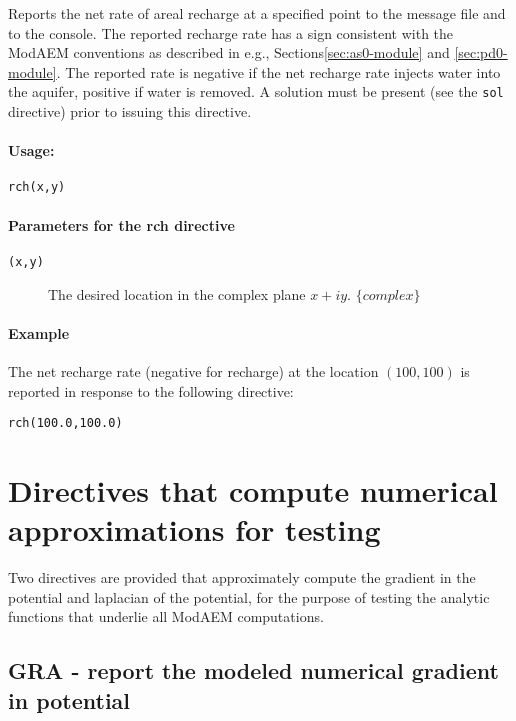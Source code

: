 Reports the net rate of areal recharge at a specified point to the
message file and to the console. The reported recharge rate has a
sign consistent with the ModAEM conventions as described in e.g.,
Sections\ref{sec:as0-module} and \ref{sec:pd0-module}. The reported
rate is negative if the net recharge rate injects water into the aquifer,
positive if water is removed. A solution must be present (see the
\texttt{sol} directive) prior to issuing this directive.


\paragraph{Usage:}
\begin{verbatim}
rch(x,y)
\end{verbatim}

\paragraph{Parameters for the \textsf{rch} directive }
\begin{description}
\item [{\texttt{(x,y)}}] The desired location in the complex plane $x+iy$.
$\{complex\}$
\end{description}

\paragraph{Example}

The net recharge rate (negative for recharge) at the location $(100,100)$
is reported in response to the following directive:
\begin{verbatim}
rch(100.0,100.0)
\end{verbatim}

\section{Directives that compute numerical approximations for testing}

Two directives are provided that approximately compute the gradient
in the potential and laplacian of the potential, for the purpose of
testing the analytic functions that underlie all ModAEM computations.


\subsection{GRA\label{GRA_directive} - report the modeled numerical gradient
in potential}


